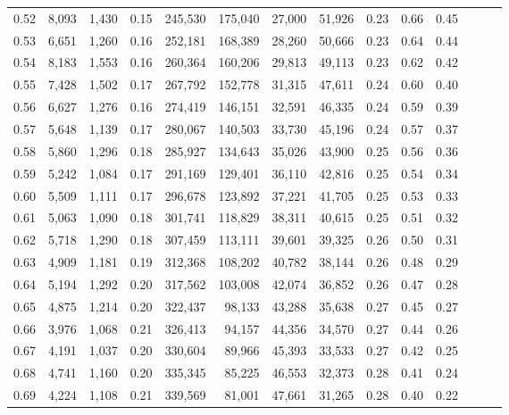 \begin{tabular}{rrrrrrrrrrrrrr}
0.52 &   8,093 &  1,430 &  0.15 &  245,530 &  175,040 &  27,000 &  51,926 &  0.23 &  0.66 &      0.45 \\
0.53 &   6,651 &  1,260 &  0.16 &  252,181 &  168,389 &  28,260 &  50,666 &  0.23 &  0.64 &      0.44 \\
0.54 &   8,183 &  1,553 &  0.16 &  260,364 &  160,206 &  29,813 &  49,113 &  0.23 &  0.62 &      0.42 \\
0.55 &   7,428 &  1,502 &  0.17 &  267,792 &  152,778 &  31,315 &  47,611 &  0.24 &  0.60 &      0.40 \\
0.56 &   6,627 &  1,276 &  0.16 &  274,419 &  146,151 &  32,591 &  46,335 &  0.24 &  0.59 &      0.39 \\
0.57 &   5,648 &  1,139 &  0.17 &  280,067 &  140,503 &  33,730 &  45,196 &  0.24 &  0.57 &      0.37 \\
0.58 &   5,860 &  1,296 &  0.18 &  285,927 &  134,643 &  35,026 &  43,900 &  0.25 &  0.56 &      0.36 \\
0.59 &   5,242 &  1,084 &  0.17 &  291,169 &  129,401 &  36,110 &  42,816 &  0.25 &  0.54 &      0.34 \\
0.60 &   5,509 &  1,111 &  0.17 &  296,678 &  123,892 &  37,221 &  41,705 &  0.25 &  0.53 &      0.33 \\
0.61 &   5,063 &  1,090 &  0.18 &  301,741 &  118,829 &  38,311 &  40,615 &  0.25 &  0.51 &      0.32 \\
0.62 &   5,718 &  1,290 &  0.18 &  307,459 &  113,111 &  39,601 &  39,325 &  0.26 &  0.50 &      0.31 \\
0.63 &   4,909 &  1,181 &  0.19 &  312,368 &  108,202 &  40,782 &  38,144 &  0.26 &  0.48 &      0.29 \\
0.64 &   5,194 &  1,292 &  0.20 &  317,562 &  103,008 &  42,074 &  36,852 &  0.26 &  0.47 &      0.28 \\
0.65 &   4,875 &  1,214 &  0.20 &  322,437 &   98,133 &  43,288 &  35,638 &  0.27 &  0.45 &      0.27 \\
0.66 &   3,976 &  1,068 &  0.21 &  326,413 &   94,157 &  44,356 &  34,570 &  0.27 &  0.44 &      0.26 \\
0.67 &   4,191 &  1,037 &  0.20 &  330,604 &   89,966 &  45,393 &  33,533 &  0.27 &  0.42 &      0.25 \\
0.68 &   4,741 &  1,160 &  0.20 &  335,345 &   85,225 &  46,553 &  32,373 &  0.28 &  0.41 &      0.24 \\
0.69 &   4,224 &  1,108 &  0.21 &  339,569 &   81,001 &  47,661 &  31,265 &  0.28 &  0.40 &      0.22 \\

\end{tabular}
